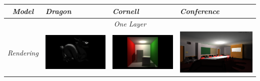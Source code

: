 \begin{table}[!ht]
\begin{center}
\begin{tabular}{| c | p{3.5cm} | p{3.5cm} | p{3.5cm} |}
\hline
\emph{Model} & \emph{Dragon} & \emph{Cornell} & \emph{Conference} \\
\hline
\multicolumn{4}{|c|}{\emph{One Layer}} \\
\hline
\emph{Rendering} &
\includegraphics[scale=0.1,trim=0 0 0 -5]{img/results/composite/dragon-1layer} &
\includegraphics[scale=0.1,trim=0 0 0 -5]{img/results/composite/cornell-1layer} &
\includegraphics[scale=0.1,trim=0 0 0 -5]{img/results/composite/conference-1layer} \\

\end{tabular}
\end{center}
\end{table}
